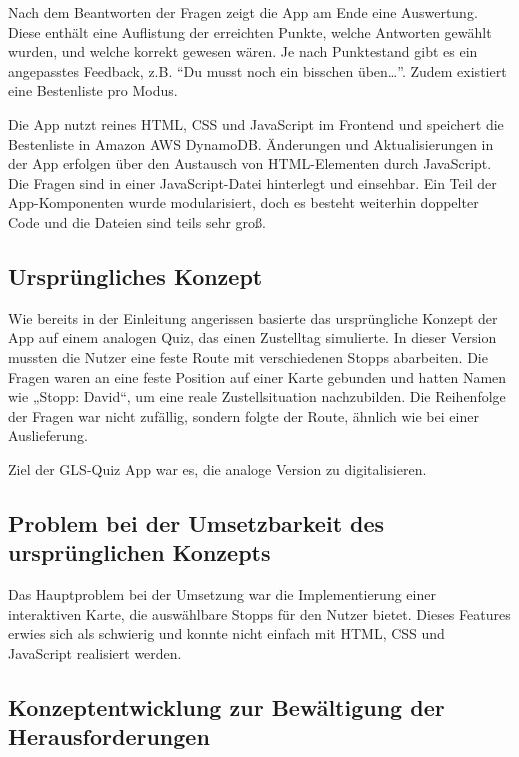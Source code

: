 \documentclass[biblatex]{lni}
\begin{document}
Nach dem Beantworten der Fragen zeigt die App am Ende eine Auswertung.
Diese enthält eine Auflistung der erreichten Punkte, welche Antworten gewählt wurden, und welche korrekt gewesen wären.
Je nach Punktestand gibt es ein angepasstes Feedback, z.B. “Du musst noch ein bisschen üben…”.
Zudem existiert eine Bestenliste pro Modus.

Die App nutzt reines HTML, CSS und JavaScript im Frontend und speichert die Bestenliste in Amazon AWS DynamoDB.
Änderungen und Aktualisierungen in der App erfolgen über den Austausch von HTML-Elementen durch JavaScript.
Die Fragen sind in einer JavaScript-Datei hinterlegt und einsehbar.
Ein Teil der App-Komponenten wurde modularisiert,
doch es besteht weiterhin doppelter Code und die Dateien sind teils sehr groß.

\subsection{Ursprüngliches Konzept}

Wie bereits in der Einleitung angerissen basierte das ursprüngliche Konzept der App auf einem analogen Quiz,
das einen Zustelltag simulierte.
In dieser Version mussten die Nutzer eine feste Route mit verschiedenen Stopps abarbeiten.
Die Fragen waren an eine feste Position auf einer Karte gebunden und hatten Namen wie „Stopp: David“,
um eine reale Zustellsituation nachzubilden.
Die Reihenfolge der Fragen war nicht zufällig, sondern folgte der Route, ähnlich wie bei einer Auslieferung.

Ziel der GLS-Quiz App war es, die analoge Version zu digitalisieren.

\subsection{Problem bei der Umsetzbarkeit des ursprünglichen Konzepts}

Das Hauptproblem bei der Umsetzung war die Implementierung einer interaktiven Karte,
die auswählbare Stopps für den Nutzer bietet.
Dieses Features erwies sich als schwierig und konnte nicht einfach mit HTML, CSS und JavaScript realisiert werden.

\subsection{Konzeptentwicklung zur Bewältigung der Herausforderungen}
\end{document}
